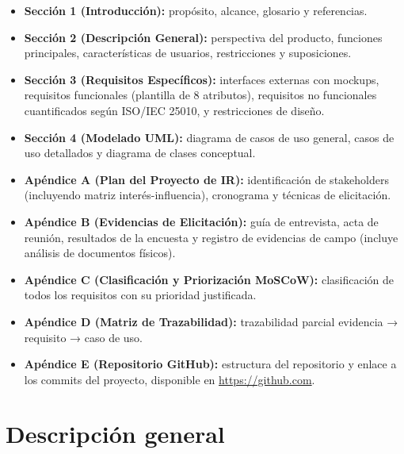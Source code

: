 \documentclass[11pt,a4paper]{article}
\begin{document}
\begin{itemize}
    \item \textbf{Sección 1 (Introducción):} propósito, alcance, glosario y referencias.
    
    \item \textbf{Sección 2 (Descripción General):} perspectiva del producto, funciones principales, características de usuarios, restricciones y suposiciones.
    
    \item \textbf{Sección 3 (Requisitos Específicos):} interfaces externas con mockups, requisitos funcionales (plantilla de 8 atributos), requisitos no funcionales cuantificados según ISO/IEC 25010, y restricciones de diseño.
    
    \item \textbf{Sección 4 (Modelado UML):} diagrama de casos de uso general, casos de uso detallados y diagrama de clases conceptual.
    
    \item \textbf{Apéndice A (Plan del Proyecto de IR):} identificación de stakeholders (incluyendo matriz interés-influencia), cronograma y técnicas de elicitación.
    
    \item \textbf{Apéndice B (Evidencias de Elicitación):} guía de entrevista, acta de reunión, resultados de la encuesta y registro de evidencias de campo (incluye análisis de documentos físicos).
    
    \item \textbf{Apéndice C (Clasificación y Priorización MoSCoW):} clasificación de todos los requisitos con su prioridad justificada.
    
    \item \textbf{Apéndice D (Matriz de Trazabilidad):} trazabilidad parcial evidencia → requisito → caso de uso.
    
    \item \textbf{Apéndice E (Repositorio GitHub):} estructura del repositorio y enlace a los commits del proyecto, disponible en \url{https://github.com}.
    
\end{itemize}


\section{Descripción general}
\end{document}
